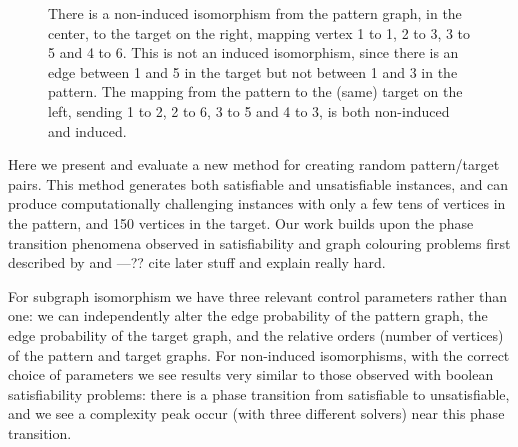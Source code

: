 \documentclass[letterpaper]{article}
\begin{document}
\begin{figure}[b]

    \caption{There is a non-induced isomorphism from the pattern graph, in the center, to the target
    on the right, mapping vertex 1 to 1, 2 to 3, 3 to 5 and 4 to 6. This is not an induced
    isomorphism, since there is an edge between 1 and 5 in the target but not between 1 and 3 in the
    pattern. The mapping from the pattern to the (same) target on the left, sending 1 to 2, 2 to 6, 3 to
    5 and 4 to 3, is both non-induced and induced.}
    \label{figure:sip}
\end{figure}

Here we present and evaluate a new method for creating random pattern/target pairs. This method
generates both satisfiable and unsatisfiable instances, and can produce computationally challenging
instances with only a few tens of vertices in the pattern, and 150 vertices in the target. Our work
builds upon the phase transition phenomena observed in satisfiability and graph colouring problems
first described by \citet{Cheeseman:1991} and \citet{Mitchell:1992}---?? cite later stuff and
explain really hard.

For subgraph isomorphism we have three relevant control parameters rather than one: we can
independently alter the edge probability of the pattern graph, the edge probability of the target
graph, and the relative orders (number of vertices) of the pattern and target graphs.  For
non-induced isomorphisms, with the correct choice of parameters we see results very similar to those
observed with boolean satisfiability problems: there is a phase transition from satisfiable to
unsatisfiable, and we see a complexity peak occur (with three different solvers) near this phase
transition.
\end{document}
